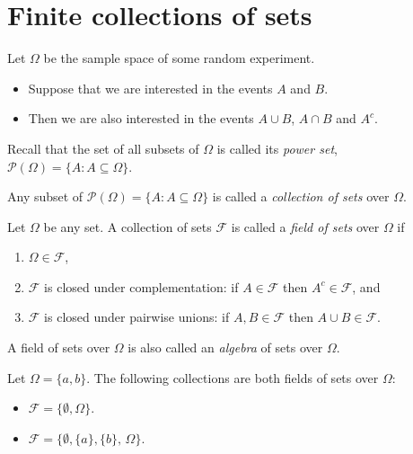 \documentclass[lecture]{csm}
\def\it{\item}
\def\bit{\begin{itemize}}
\def\eit{\end{itemize}}
\def\ben{\begin{enumerate}}
\def\een{\end{enumerate}}
\begin{document}
\maketitle
\tableofcontents

\section{Finite collections of sets}
Let $\Omega$ be the sample space of some random experiment.
\bit
\it Suppose that we are interested in the events $A$ and $B$.
\it Then we are also interested in the events $A\cup B$, $A\cap B$ and $A^c$.
\eit

\vspace*{2ex}
Recall that the set of all subsets of $\Omega$ is called its \emph{power set}, 
$\mathcal{P}(\Omega) = \{A:A\subseteq\Omega\}$.

\begin{definition}
Any subset of $\mathcal{P}(\Omega) = \{A:A\subseteq\Omega\}$ is called a \emph{collection of sets} over $\Omega$. 
\end{definition}

\begin{definition}
Let $\Omega$ be any set. A collection of sets $\mathcal{F}$ is called a \emph{field of sets} over $\Omega$ if 
\ben
\it $\Omega\in\mathcal{F}$,
\it $\mathcal{F}$ is closed under complementation: if $A\in\mathcal{F}$ then $A^c\in\mathcal{F}$, and
\it $\mathcal{F}$ is closed under pairwise unions: if $A,B\in\mathcal{F}$ then $A\cup B\in\mathcal{F}$.
\een
\end{definition}

\begin{remark}
A field of sets over $\Omega$ is also called an \emph{algebra} of sets over $\Omega$.
\end{remark}

\begin{example}
Let $\Omega=\{a,b\}$. The following collections are both fields of sets over $\Omega$:
\begin{hidebox}
\bit
\it $\mathcal{F} = \{\emptyset,\Omega\}$.
\it $\mathcal{F} = \big\{\emptyset,\{a\},\{b\},\,\Omega\big\}$.
\eit
\end{hidebox}
\end{example}
\end{document}
